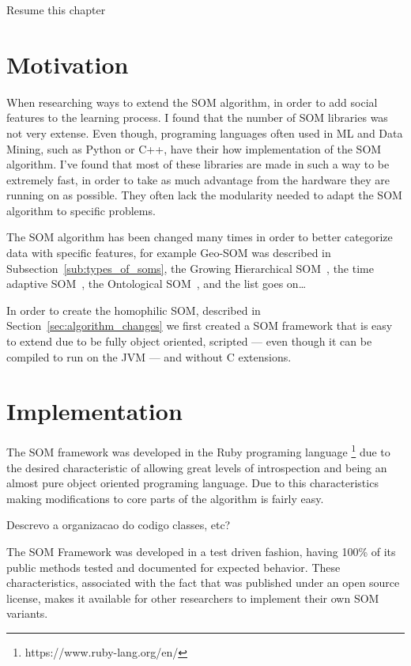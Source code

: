 {\color{red} Resume this chapter }

\section{Motivation}
\label{sec:motivation}
When researching ways to extend the \ac{SOM} algorithm, in order to add social features to the learning process. I found that the number of \ac{SOM} libraries was not very extense. Even though, programing languages often used in \ac{ML} and Data Mining, such as Python or C++, have their how implementation of the \ac{SOM} algorithm. I've found that most of these libraries are made in such a way to be extremely fast, in order to take as much advantage from the hardware they are running on as possible. They often lack the modularity needed to adapt the \ac{SOM} algorithm to specific problems.

The \ac{SOM} algorithm has been changed many times in order to better categorize data with specific features, for example Geo-SOM was described in Subsection~\ref{sub:types_of_soms}, the Growing Hierarchical SOM~\cite[]{1058070}, the time adaptive SOM~\cite[]{1187438}, the Ontological SOM~\cite[]{5446427}, and the list goes on\dots  

In order to create the homophilic SOM, described in Section~\ref{sec:algorithm_changes} we first created a SOM framework that is easy to extend due to be fully object oriented, scripted --- even though it can be compiled to run on the JVM --- and without C extensions.

\section{Implementation}
\label{sec:implementation}
The \ac{SOM} framework was developed in the Ruby programing language \footnote{https://www.ruby-lang.org/en/} due to the desired characteristic of allowing great levels of introspection and being an almost pure object oriented programing language. Due to this characteristics making modifications to core parts of the algorithm is fairly easy.

{\color{red} Descrevo a organizacao do codigo classes, etc? }

The \ac{SOM} Framework was developed in a test driven fashion, having 100\% of its public methods tested and documented for expected behavior. These characteristics, associated with the fact that was published under an open source license, makes it available for other researchers to implement their own SOM variants.

